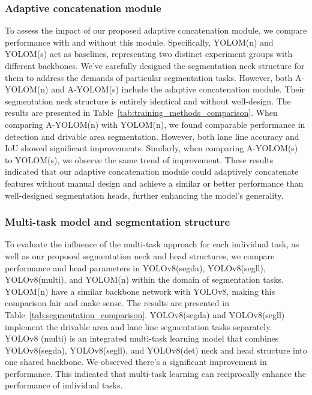 \documentclass[lettersize,journal]{IEEEtran}
\begin{document}
\subsubsection{Adaptive concatenation module}
\label{subsubsec: Adaptive concatenation module}
To assess the impact of our proposed adaptive concatenation module, we compare performance with and without this module. Specifically, YOLOM(n) and YOLOM(s) act as baselines, representing two distinct experiment groups with different backbones. We've carefully designed the segmentation neck structure for them to address the demands of particular segmentation tasks. However, both A-YOLOM(n) and A-YOLOM(s) include the adaptive concatenation module. Their segmentation neck structure is entirely identical and without well-design. The results are presented in Table~\ref{tab:training_methods_comparison}. When comparing A-YOLOM(n) with YOLOM(n), we found comparable performance in detection and drivable area segmentation. However, both lane line accuracy and IoU showed significant improvements. Similarly, when comparing A-YOLOM(s) to YOLOM(s), we observe the same trend of improvement. These results indicated that our adaptive concatenation module could adaptively concatenate features without manual design and achieve a similar or better performance than well-designed segmentation heads, further enhancing the model’s generality.



\subsubsection{Multi-task model and segmentation structure}
\label{subsubsec: Multi-task model and segmentation structure}
To evaluate the influence of the multi-task approach for each individual task, as well as our proposed segmentation neck and head structures, we compare performance and head parameters in YOLOv8(segda), YOLOv8(segll), YOLOv8(multi), and YOLOM(n) within the domain of segmentation tasks. YOLOM(n) have a similar backbone network with YOLOv8, making this comparison fair and make sense. The results are presented in Table~\ref{tab:segmentation_comparison}. YOLOv8(segda) and YOLOv8(segll) implement the drivable area and lane line segmentation tasks separately. YOLOv8 (multi) is an integrated multi-task learning model that combines YOLOv8(segda), YOLOv8(segll), and YOLOv8(det) neck and head structure into one shared backbone. We observed there's a significant improvement in performance. This indicated that multi-task learning can reciprocally enhance the performance of individual tasks. 
\end{document}
